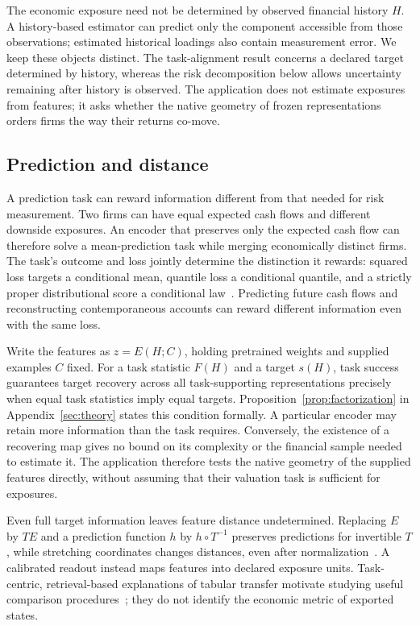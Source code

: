 \documentclass[11pt]{article}
\begin{document}
The economic exposure need not be determined by observed financial history
$H$. A history-based estimator can predict only the component accessible from
those observations; estimated historical loadings also contain measurement
error. We keep these objects distinct. The task-alignment result concerns a
declared target determined by history, whereas the risk decomposition below
allows uncertainty remaining after history is observed. The application does
not estimate exposures from features; it asks whether the native geometry of
frozen representations orders firms the way their returns co-move.

\subsection{Prediction and distance}
A prediction task can reward information different from that needed for risk
measurement. Two firms can have equal expected cash flows and different downside
exposures. An encoder that preserves only the expected cash flow can therefore
solve a mean-prediction task while merging economically distinct firms.
The task's outcome and loss jointly determine the distinction it rewards:
squared loss targets a conditional mean, quantile loss a conditional quantile,
and a strictly proper distributional score a conditional
law~\cite{gneiting2011}.
Predicting future cash flows and reconstructing contemporaneous accounts can
reward different information even with the same loss.

Write the features as $z=E(H;C)$, holding pretrained weights and supplied
examples $C$ fixed. For a task statistic $F(H)$ and a target $s(H)$,
task success
guarantees target recovery across all task-supporting representations precisely
when equal task statistics imply equal targets.
Proposition~\ref{prop:factorization} in Appendix~\ref{sec:theory} states this
condition formally. A particular encoder may retain more information than the
task requires. Conversely, the existence of a recovering map gives no bound on
its complexity or the financial sample needed to estimate it. The application
therefore tests the native geometry of the supplied features directly, without
assuming that their valuation task is sufficient for exposures.

Even full target information leaves feature distance undetermined. Replacing
$E$ by $T E$ and a prediction function $h$ by $h\circ T^{-1}$ preserves
predictions for invertible $T$, while stretching coordinates changes distances,
even after normalization~\cite{steck2024}. A calibrated readout instead
maps features
into declared exposure units. Task-centric, retrieval-based explanations of
tabular transfer motivate studying useful comparison
procedures~\cite{shaheen2026};
they do not identify the economic metric of exported states.
\end{document}
